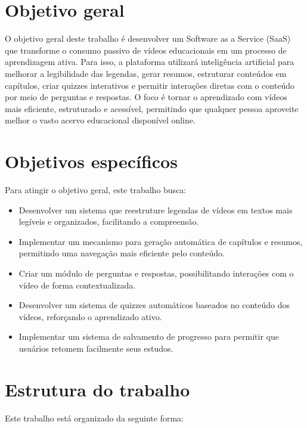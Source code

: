 \documentclass[tcc,capa]{texufpel}
\begin{document}
\section{Objetivo geral}
O objetivo geral deste trabalho é desenvolver um Software as a Service (SaaS) que transforme o consumo passivo de vídeos educacionais em um processo de aprendizagem ativa. Para isso, a plataforma utilizará inteligência artificial para melhorar a legibilidade das legendas, gerar resumos, estruturar conteúdos em capítulos, criar quizzes interativos e permitir interações diretas com o conteúdo por meio de perguntas e respostas. O foco é tornar o aprendizado com vídeos mais eficiente, estruturado e acessível, permitindo que qualquer pessoa aproveite melhor o vasto acervo educacional disponível online.
\section{Objetivos específicos}

Para atingir o objetivo geral, este trabalho busca:

\begin{itemize}
    \item Desenvolver um sistema que reestruture legendas de vídeos em textos mais legíveis e organizados, facilitando a compreensão.
    \item Implementar um mecanismo para geração automática de capítulos e resumos, permitindo uma navegação mais eficiente pelo conteúdo.
    \item Criar um módulo de perguntas e respostas, possibilitando interações com o vídeo de forma contextualizada.
    \item Desenvolver um sistema de quizzes automáticos baseados no conteúdo dos vídeos, reforçando o aprendizado ativo.
    \item Implementar um sistema de salvamento de progresso para permitir que usuários retomem facilmente seus estudos.
\end{itemize}

\section{Estrutura do trabalho}
Este trabalho está organizado da seguinte forma:
\end{document}
